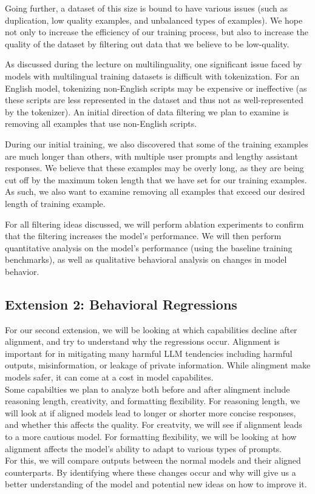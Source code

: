 \documentclass[11pt]{article}
\begin{document}
Going further, a dataset of this size is bound to have various issues (such as duplication, low quality examples, and unbalanced types of examples). We hope not only to increase the efficiency of our training process, but also to increase the quality of the dataset by filtering out data that we believe to be low-quality. 

As discussed during the lecture on multilinguality, one significant issue faced by models with multilingual training datasets is difficult with tokenization. For an English model, tokenizing non-English scripts may be expensive or ineffective (as these scripts are less represented in the dataset and thus not as well-represented by the tokenizer). An initial direction of data filtering we plan to examine is removing all examples that use non-English scripts. 

During our initial training, we also discovered that some of the training examples are much longer than others, with multiple user prompts and lengthy assistant responses. We believe that these examples may be overly long, as they are being cut off by the maximum token length that we have set for our training examples. As such, we also want to examine removing all examples that exceed our desired length of training example. 

For all filtering ideas discussed, we will perform ablation experiments to confirm that the filtering increases the model's performance. We will then perform quantitative analysis on the model's performance (using the baseline training benchmarks), as well as qualitative behavioral analysis on changes in model behavior. 


\subsection{Extension 2: Behavioral Regressions}
For our second extension, we will be looking at which capabilities decline after alignment, and try to understand why the regressions occur. Alignment is important for in mitigating many harmful LLM tendencies including harmful outputs, misinformation, or leakage of private information. While alingment make models safer, it can come at a cost in model capabilites. 
 \\ Some capabilties we plan to analyze both before and after alingment include reasoning length, creativity, and formatting flexibility. For reasoning length, we will look at if aligned models lead to longer or shorter more concise responses, and whether this affects the quality. For creatvity, we will see if alignment leads to a more cautious model. For formatting flexibility, we will be looking at how alignment affects the model's ability to adapt to various types of prompts.
\\  For this, we will compare outputs between the normal models and their aligned counterparts.  By identifying where these changes occur and why will give us a better understanding of the model and potential new ideas on how to improve it. 
\end{document}
